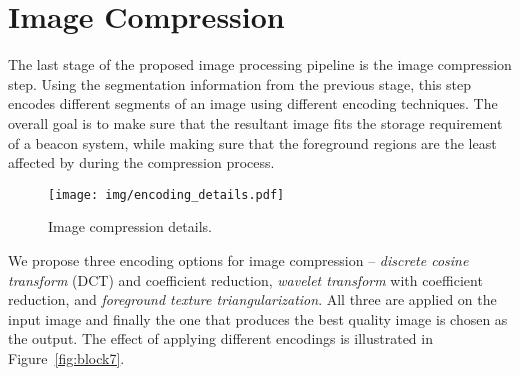 \section{Image Compression}
\label{sec:algo_icomp}

The last stage of the proposed image processing pipeline is the image compression step. Using the segmentation information from the previous stage, this step encodes different segments of an image using different encoding techniques. The overall goal is to make sure that the resultant image fits the storage requirement of a beacon system, while making sure that the foreground regions are the least affected by during the compression process.




\begin{figure}[!thb]
    \begin{center}
	    \texttt{[image: img/encoding\_details.pdf]}
	    \caption{\footnotesize Image compression details.}
	    \label{fig:block}
    \end{center}
\end{figure}





We propose three encoding options for image compression -- \textit{discrete cosine transform} (DCT) and coefficient reduction, \textit{wavelet transform} with coefficient reduction, and \textit{foreground texture triangularization}. All three are applied on the input image and finally the one that produces the best quality image is chosen as the output. The effect of applying different encodings is illustrated in Figure~\ref{fig:block7}.


